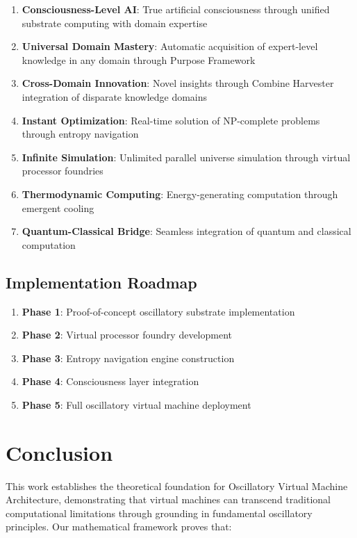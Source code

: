 \documentclass[12pt,a4paper]{article}
\begin{document}
\begin{enumerate}
\item \textbf{Consciousness-Level AI}: True artificial consciousness through unified substrate computing with domain expertise
\item \textbf{Universal Domain Mastery}: Automatic acquisition of expert-level knowledge in any domain through Purpose Framework
\item \textbf{Cross-Domain Innovation}: Novel insights through Combine Harvester integration of disparate knowledge domains
\item \textbf{Instant Optimization}: Real-time solution of NP-complete problems through entropy navigation
\item \textbf{Infinite Simulation}: Unlimited parallel universe simulation through virtual processor foundries
\item \textbf{Thermodynamic Computing}: Energy-generating computation through emergent cooling
\item \textbf{Quantum-Classical Bridge}: Seamless integration of quantum and classical computation
\end{enumerate}

\subsection{Implementation Roadmap}

\begin{enumerate}
\item \textbf{Phase 1}: Proof-of-concept oscillatory substrate implementation
\item \textbf{Phase 2}: Virtual processor foundry development
\item \textbf{Phase 3}: Entropy navigation engine construction
\item \textbf{Phase 4}: Consciousness layer integration
\item \textbf{Phase 5}: Full oscillatory virtual machine deployment
\end{enumerate}

\section{Conclusion}

This work establishes the theoretical foundation for Oscillatory Virtual Machine Architecture, demonstrating that virtual machines can transcend traditional computational limitations through grounding in fundamental oscillatory principles. Our mathematical framework proves that:
\end{document}
